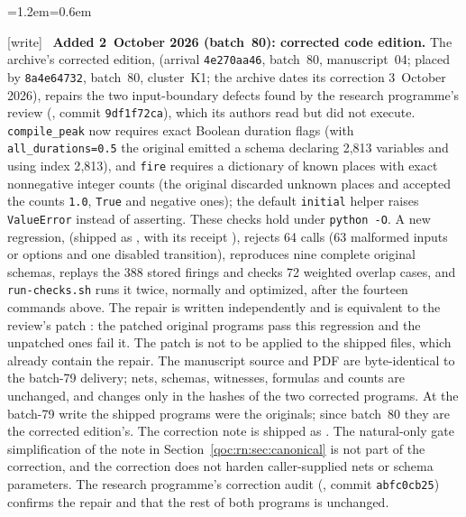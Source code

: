 \documentclass[11pt,letterpaper]{article}
\theoremstyle{definition}
\theoremstyle{remark}
\newcommand{\rncode}[1]{\texttt{#1}}
\newcommand{\wtag}{\textup{[write]}}
\newenvironment{writenote}{\par\smallskip\begin{list}{}{\leftmargin=1.2em\rightmargin=0.6em}\item[]\small\wtag\ }{\end{list}\smallskip}
\begin{document}
\begin{writenote}
\textbf{Added 2~October 2026 (batch~80): corrected code edition.} The archive's corrected edition,  (arrival \texttt{4e270aa46}, batch~80, manuscript~04; placed by \texttt{8a4e64732}, batch~80, cluster~K1; the archive dates its correction 3~October 2026), repairs the two input-boundary defects found by the research programme's review (, commit \texttt{9df1f72ca}), which its authors read but did not execute. \rncode{compile\_peak} now requires exact Boolean duration flags (with \rncode{all\_durations=0.5} the original emitted a schema declaring 2{,}813 variables and using index 2{,}813), and \rncode{fire} requires a dictionary of known places with exact nonnegative integer counts (the original discarded unknown places and accepted the counts \rncode{1.0}, \rncode{True} and negative ones); the default \rncode{initial} helper raises \rncode{ValueError} instead of asserting. These checks hold under \rncode{python -O}. A new regression,  (shipped as , with its receipt ), rejects 64 calls (63 malformed inputs or options and one disabled transition), reproduces nine complete original schemas, replays the 388 stored firings and checks 72 weighted overlap cases, and \rncode{run-checks.sh} runs it twice, normally and optimized, after the fourteen commands above. The repair is written independently and is equivalent to the review's patch : the patched original programs pass this regression and the unpatched ones fail it. The patch is not to be applied to the shipped files, which already contain the repair. The manuscript source and PDF are byte-identical to the batch-79 delivery; nets, schemas, witnesses, formulas and counts are unchanged, and  changes only in the hashes of the two corrected programs. At the batch-79 write the shipped programs were the originals; since batch~80 they are the corrected edition's. The correction note is shipped as . The natural-only gate simplification of the note in Section~\ref{qoc:rn:sec:canonical} is not part of the correction, and the correction does not harden caller-supplied nets or schema parameters. The research programme's correction audit (, commit \texttt{abfc0cb25}) confirms the repair and that the rest of both programs is unchanged.
\end{writenote}
\end{document}
